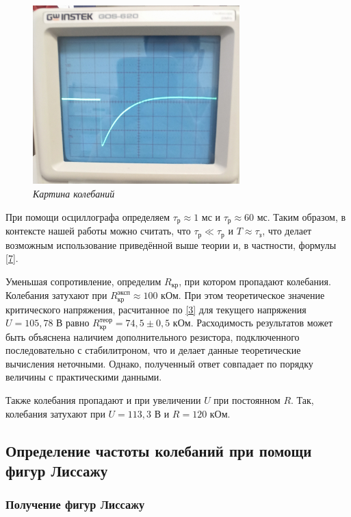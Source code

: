 \documentclass[a4paper,12pt]{article} %
\begin{document}
\begin{figure}[H]
	\begin{center}
		\includegraphics[width=8cm]{ris5.jpg}
	\end{center}
	\caption{\textit{Картина колебаний}}
	\label{ris5}
\end{figure}

При помощи осциллографа определяем $ \tau_\text{р} \approx 1$ мс и $ \tau_\text{р} \approx 60 $ мс. Таким образом, в контексте нашей работы можно считать, что $ \tau_\text{р} \ll \tau_\text{р} $ и $ T \approx \tau_\text{з} $, что делает возможным использование приведённой выше теории и, в частности, формулы \eqref{7}.

Уменьшая сопротивление, определим $ R_\text{кр} $, при котором пропадают колебания. Колебания затухают при $ R_\text{кр}^\text{эксп} \approx 100 $ кОм. При этом теоретическое значение критического напряжения, расчитанное по \eqref{3} для текущего напряжения $ U = 105,78 $ В равно $ R_\text{кр}^\text{теор} = 74,5 \pm 0,5 $ кОм. Расходимость результатов может быть объяснена наличием дополнительного резистора, подключенного последовательно с стабилитроном, что и делает данные теоретические вычисления неточными. Однако, полученный ответ совпадает по порядку величины с практическими данными.

Также колебания пропадают и при увеличении $ U $ при постоянном $ R $. Так, колебания затухают при $ U = 113,3 $ В и $ R = 120 $ кОм.

\subsection{Определение частоты колебаний при помощи фигур Лиссажу}

\subsubsection{Получение фигур Лиссажу}
\end{document}
